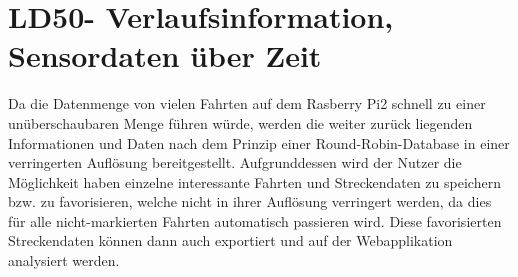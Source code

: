\section{LD50- Verlaufsinformation, Sensordaten über Zeit}
Da die Datenmenge von vielen Fahrten auf dem Rasberry Pi2 schnell zu einer unüberschaubaren Menge führen würde, werden die weiter zurück liegenden Informationen und Daten nach dem Prinzip einer Round-Robin-Database in einer verringerten Auflösung bereitgestellt. 
Aufgrunddessen wird der Nutzer die Möglichkeit haben einzelne interessante Fahrten und Streckendaten zu speichern bzw. zu favorisieren, welche nicht in ihrer Auflösung verringert werden, da dies für alle nicht-markierten Fahrten automatisch passieren wird. Diese favorisierten Streckendaten können dann auch exportiert und auf der Webapplikation analysiert werden.